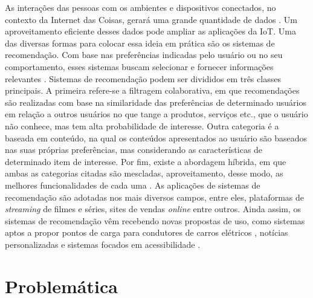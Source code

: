 As interações das pessoas com os ambientes e dispositivos conectados, no contexto da Internet das Coisas, gerará uma grande quantidade de dados \cite{Chiang2016}. Um aproveitamento eficiente desses dados pode ampliar as aplicações da IoT. Uma das diversas formas para colocar essa ideia em prática são os sistemas de recomendação. Com base nas preferências indicadas pelo usuário ou no seu comportamento, esses sistemas buscam selecionar e fornecer informações relevantes \cite{Filho2008}. Sistemas de recomendação podem ser divididos em três classes principais. A primeira refere-se a filtragem colaborativa, em que recomendações são realizadas com base na similaridade das preferências de determinado usuários em relação a outros usuários no que tange a produtos, serviços etc., que o usuário não conhece, mas tem alta probabilidade de interesse. Outra categoria é a baseada em conteúdo, na qual os conteúdos apresentados ao usuário são baseados nas suas próprias preferências, mas considerando as características de determinado item de interesse. Por fim, existe a abordagem híbrida, em que ambas as categorias citadas são mescladas, aproveitamento, desse modo, as melhores funcionalidades de cada uma \cite{Thomas2016}.
As aplicações de sistemas de recomendação são adotadas nos mais diversos campos, entre eles, plataformas de \textit{streaming} de filmes e séries, sites de vendas \textit{online} entre outros. Ainda assim, os sistemas de recomendação vêm recebendo novas propostas de uso, como sistemas aptos a propor pontos de carga para condutores de carros elétricos \cite{Ferreira2011}, notícias personalizadas \cite{Yeung2010} e sistemas focados em acessibilidade \cite{GomesCardoso2016}. 


\section{Problemática}



